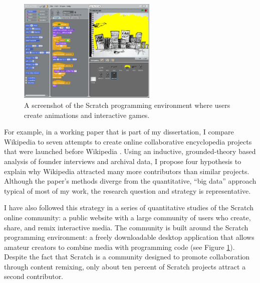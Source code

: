 \documentclass[10pt]{memoir}
\begin{document}

\begin{figure}
 \begin{centering}
 \includegraphics[width=2.6in]{figures/scratch_screenshot_default.png}
 \caption{A screenshot of the Scratch programming environment
   where users create animations and interactive games.}
 \label{fig:scratchapp}
 \end{centering}
 \vspace{-2em}
\end{figure}


For example, in a working paper that is part of my dissertation, I
compare Wikipedia to seven attempts to create online collaborative
encyclopedia projects that were launched before Wikipedia
\cite{hill_almost_2012}. Using an inductive, grounded-theory based
analysis of founder interviews and archival data, I propose four
hypothesis to explain why Wikipedia attracted many more contributors
than similar projects. Although the paper's methods diverge from the
quantitative, ``big data'' approach typical of most of my work, the
research question and strategy is representative.

I have also followed this strategy in a series of quantitative
studies of the Scratch online community: a public website with a large
community of users who create, share, and remix interactive media. The
community is built around the Scratch programming environment: a
freely downloadable desktop application that allows amateur creators
to combine media with programming code (see Figure
\ref{fig:scratchapp}). Despite the fact that Scratch is a community
designed to promote collaboration through content remixing, only about
ten percent of Scratch projects attract a second
contributor.
\end{document}
